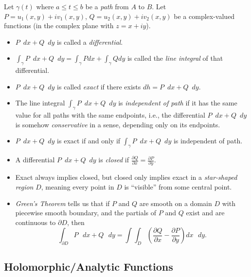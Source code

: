 \documentclass[12pt]{article}
\begin{document}
Let $\gamma(t)$ where $a\leq t\leq b$ be a {\it path} from $A$ to $B$.
Let $P = u_1(x,y) + iv_1(x,y)$, $Q = u_2(x,y) + iv_2(x,y)$ be a
complex-valued functions (in the complex plane with $z = x + iy$).
\begin{itemize}
	\item $P$~$dx + Q$~$dy$ is called a {\it differential}.
	\item $\int_\gamma P$~$dx+Q$~$dy=\int_\gamma P dx+\int_\gamma Q dy$
		is called the {\it line integral} of that differential.
	\item $P$~$dx+Q$~$dy$ is called {\it exact} if there exists
		$dh = P$~$dx + Q$~$dy$.
	\item The line integral $\int_\gamma P$~$dx+Q$~$dy$ is 
		{\it independent of path} if it has the same value for all
		paths with the same endpoints, i.e., the differential
		$P$~$dx + Q$~$dy$ is somehow {\it conservative} in a sense,
		depending only on its endpoints.
	\item $P$~$dx+Q$~$dy$ is exact if and only if 
		$\int_\gamma P$~$dx+Q$~$dy$ is independent of path.
	\item A differential $P$~$dx+Q$~$dy$ is {\it closed} if 
		$\frac{\partial Q}{\partial x}=\frac{\partial P}{\partial y}$.
	\item Exact always implies closed, but closed only implies exact
		in a {\it star-shaped region} $D$, meaning every point in $D$
		is ``visible'' from some central point.
	\item {\it Green's Theorem} tells us that if $P$ and $Q$ are smooth 
		on a domain $D$ with piecewise smooth boundary, and the
		partials of $P$ and $Q$ exist and are continuous to 
		$\partial D$, then
		$$
		\int_{\partial D} P\text{ }dx + Q\text{ }dy 
		= \int\int_D \left(\frac{\partial Q}{\partial x} -
		\frac{\partial P}{\partial y}\right) dx\text{ }dy.
		$$
\end{itemize}

\subsection*{Holomorphic/Analytic Functions}
\end{document}
